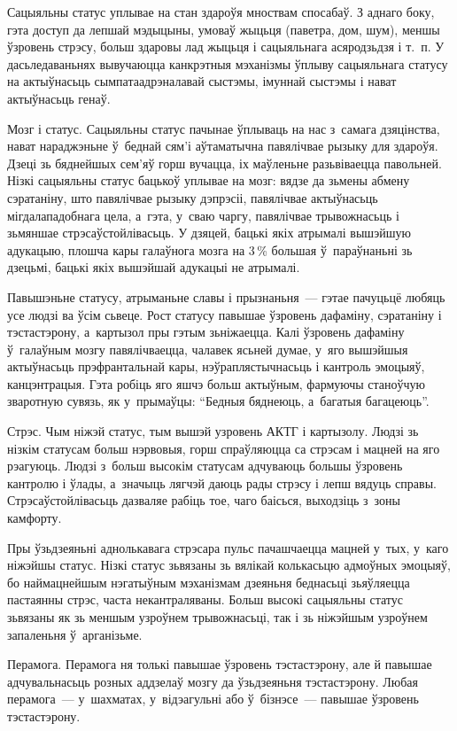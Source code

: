 Сацыяльны статус уплывае на стан здароўя мноствам спосабаў. З аднаго боку, гэта доступ да лепшай мэдыцыны, умоваў жыцьця (паветра, дом, шум), меншы ўзровень стрэсу, больш здаровы лад жыцьця і сацыяльнага асяродзьдзя і т.~п. У дасьледаваньнях вывучаюцца канкрэтныя мэханізмы ўплыву сацыяльнага статусу на актыўнасьць сымпатаадрэналавай сыстэмы, імуннай сыстэмы і нават актыўнасьць генаў.

Мозг і статус. Сацыяльны статус пачынае ўплываць на нас з~самага дзяцінства, нават нараджэньне ў~беднай сям'і аўтаматычна павялічвае рызыку для здароўя. Дзеці зь бяднейшых сем'яў горш вучацца, іх маўленьне разьвіваецца павольней. Нізкі сацыяльны статус бацькоў уплывае на мозг: вядзе да зьмены абмену сэратаніну, што павялічвае рызыку дэпрэсіі, павялічвае актыўнасьць мігдалападобнага цела, а~гэта, у~сваю чаргу, павялічвае трывожнасьць і зьмяншае стрэсаўстойлівасьць. У дзяцей, бацькі якіх атрымалі вышэйшую адукацыю, плошча кары галаўнога мозга на 3\,\% большая ў~параўнаньні зь дзецьмі, бацькі якіх вышэйшай адукацыі не атрымалі.

Павышэньне статусу, атрыманьне славы і прызнаньня~--- гэтае пачуцьцё любяць усе людзі ва ўсім сьвеце. Рост статусу павышае ўзровень дафаміну, сэратаніну і тэстастэрону, а~картызол пры гэтым зьніжаецца. Калі ўзровень дафаміну ў~галаўным мозгу павялічваецца, чалавек ясьней думае, у~яго вышэйшыя актыўнасьць прэфрантальнай кары, нэўраплястычнасьць і кантроль эмоцыяў, канцэнтрацыя. Гэта робіць яго яшчэ больш актыўным, фармуючы станоўчую зваротную сувязь, як у~прымаўцы: ``Бедныя бяднеюць, а~багатыя багацеюць''.

Стрэс. Чым ніжэй статус, тым вышэй узровень АКТГ і картызолу. Людзі зь нізкім статусам больш нэрвовыя, горш спраўляюцца са стрэсам і мацней на яго рэагуюць. Людзі з~больш высокім статусам адчуваюць большы ўзровень кантролю і ўлады, а~значыць лягчэй даюць рады стрэсу і лепш вядуць справы. Стрэсаўстойлівасьць дазваляе рабіць тое, чаго баісься, выходзіць з~зоны камфорту.

Пры ўзьдзеяньні аднолькавага стрэсара пульс пачашчаецца мацней у~тых, у~каго ніжэйшы статус. Нізкі статус зьвязаны зь вялікай колькасьцю адмоўных эмоцыяў, бо наймацнейшым нэгатыўным мэханізмам дзеяньня беднасьці зьяўляецца пастаянны стрэс, часта некантраляваны. Больш высокі сацыяльны статус зьвязаны як зь меншым узроўнем трывожнасьці, так і зь ніжэйшым узроўнем запаленьня ў~арганізьме.

Перамога. Перамога ня толькі павышае ўзровень тэстастэрону, але й павышае адчувальнасьць розных аддзелаў мозгу да ўзьдзеяньня тэстастэрону. Любая перамога~--- у~шахматах, у~відэагульні або ў~бізнэсе~--- павышае ўзровень тэстастэрону. 


